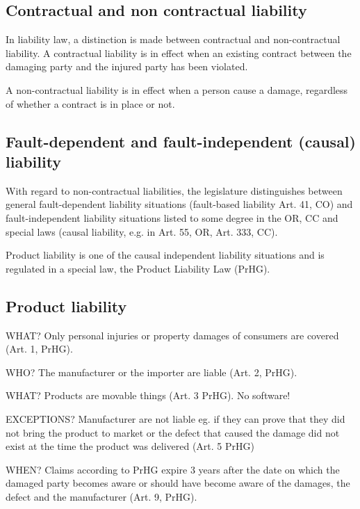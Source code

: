 \subsection{Contractual and non contractual liability}
\begin{compactitem}
	\item In liability law, a distinction is made between contractual and non-contractual liability. A contractual liability is in effect when an existing contract between the damaging party and the injured party has been violated.
	\item A non-contractual liability is in effect when a person cause a damage, regardless of whether a contract is in place or not.
\end{compactitem}

\subsection{Fault-dependent and fault-independent (causal) liability}
\begin{compactitem}
	\item With regard to non-contractual liabilities, the legislature distinguishes between general fault-dependent liability situations (fault-based liability Art. 41, CO) and fault-independent liability situations listed to some degree in the OR, CC and special laws (causal liability, e.g. in Art. 55, OR, Art. 333, CC).
	\item Product liability is one of the causal independent liability situations and is regulated in a special law, the Product Liability Law (PrHG).
\end{compactitem}

\subsection{Product liability}
\begin{compactitem}
	\item WHAT? Only personal injuries or property damages of consumers are covered (Art. 1, PrHG).
	\item WHO? The manufacturer or the importer are liable (Art. 2, PrHG).
	\item WHAT? Products are movable things (Art. 3 PrHG). No software!
	\item EXCEPTIONS? Manufacturer are not liable eg. if they can prove that they did not bring the product to market or the defect that caused the damage did not exist at the time the product was delivered (Art. 5 PrHG)
	\item WHEN? Claims according to PrHG expire 3 years after the date on which the damaged party becomes aware or should have become aware of the damages, the defect and the manufacturer (Art. 9, PrHG).
\end{compactitem}

